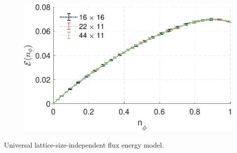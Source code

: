 \begin{frame}
\begin{figure}
\begin{minipage}[c]{.45\textwidth}
    \end{minipage}
    \begin{minipage}[c]{.45\textwidth}
        \includegraphics[width = 1\textwidth]{figures/limit_band.pdf}
    \end{minipage}
\end{figure}
\hfill Universal lattice-size-independent flux energy model.

\end{frame}




